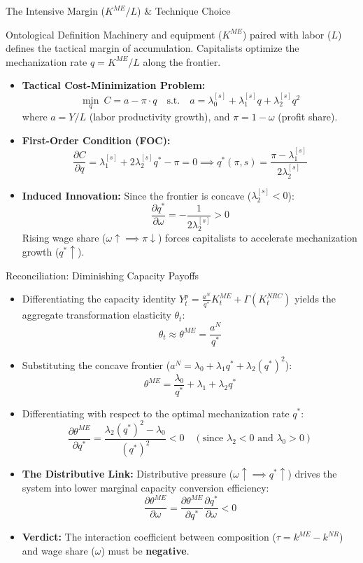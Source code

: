 \documentclass[10pt]{beamer}
\begin{document}
\begin{frame}{The Intensive Margin ($K^{ME}/L$) \& Technique Choice}
  \begin{block}{Ontological Definition}
    Machinery and equipment ($K^{ME}$) paired with labor ($L$) defines the tactical margin of accumulation. Capitalists optimize the mechanization rate $q = K^{ME}/L$ along the frontier.
  \end{block}
  \begin{itemize}
    \item \textbf{Tactical Cost-Minimization Problem:}
      $$\min_{q} \ C = a - \pi \cdot q \quad \text{s.t.} \quad a = \lambda_0^{[s]} + \lambda_1^{[s]} q + \lambda_2^{[s]} q^2$$
      where $a = Y/L$ (labor productivity growth), and $\pi = 1-\omega$ (profit share).
    \item \textbf{First-Order Condition (FOC):}
      $$\frac{\partial C}{\partial q} = \lambda_1^{[s]} + 2\lambda_2^{[s]}q^* - \pi = 0 \implies q^*(\pi, s) = \frac{\pi - \lambda_1^{[s]}}{2\lambda_2^{[s]}}$$
    \item \textbf{Induced Innovation:} Since the frontier is concave ($\lambda_2^{[s]} < 0$):
      $$\frac{\partial q^*}{\partial \omega} = -\frac{1}{2\lambda_2^{[s]}} > 0$$
      Rising wage share ($\omega \uparrow \implies \pi \downarrow$) forces capitalists to accelerate mechanization growth ($q^* \uparrow$).
  \end{itemize}
\end{frame}

\begin{frame}{Reconciliation: Diminishing Capacity Payoffs}
  \begin{itemize}
    \item Differentiating the capacity identity $Y^p_t = \frac{a^N}{q^*} K^{ME}_t + \Gamma(K^{NRC}_t)$ yields the aggregate transformation elasticity $\theta_t$:
      $$\theta_t \approx \theta^{ME} = \frac{a^N}{q^*}$$
    \item Substituting the concave frontier ($a^N = \lambda_0 + \lambda_1 q^* + \lambda_2 (q^*)^2$):
      $$\theta^{ME} = \frac{\lambda_0}{q^*} + \lambda_1 + \lambda_2 q^*$$
    \item Differentiating with respect to the optimal mechanization rate $q^*$:
      $$\frac{\partial \theta^{ME}}{\partial q^*} = \frac{\lambda_2 (q^*)^2 - \lambda_0}{(q^*)^2} < 0 \quad (\text{since } \lambda_2 < 0 \text{ and } \lambda_0 > 0)$$
    \item \textbf{The Distributive Link:} Distributive pressure ($\omega \uparrow \implies q^* \uparrow$) drives the system into lower marginal capacity conversion efficiency:
      $$\frac{\partial \theta^{ME}}{\partial \omega} = \frac{\partial \theta^{ME}}{\partial q^*} \frac{\partial q^*}{\partial \omega} < 0$$
    \item \textbf{Verdict:} The interaction coefficient between composition ($\tau = k^{ME} - k^{NR}$) and wage share ($\omega$) must be \textbf{negative}.
  \end{itemize}
\end{frame}
\end{document}
